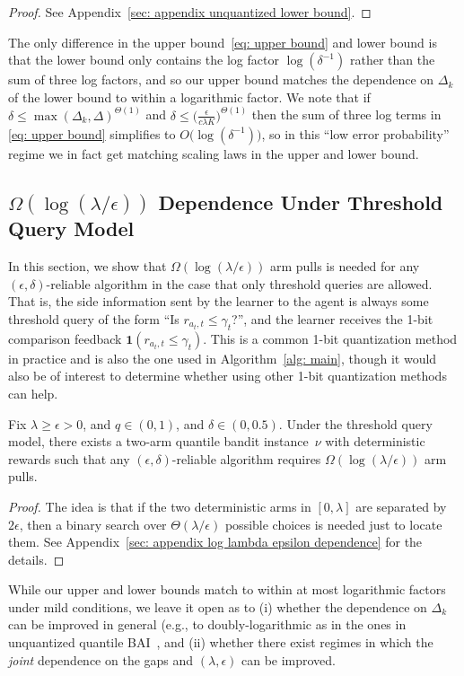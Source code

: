 \begin{proof}
    See Appendix~\ref{sec: appendix unquantized lower bound}.
\end{proof}

The only difference in the upper bound~\eqref{eq: upper bound} and lower bound is that the lower bound only contains the log factor $\log(\delta^{-1})$ rather than the sum of three log factors, and so our upper bound matches the dependence on $\Delta_k$ of the lower bound to within a logarithmic factor.  We note that if $\delta \le \max(\Delta_k,\Delta)^{\Theta(1)}$ and $\delta \le \big( \frac{\epsilon}{c\lambda K} \big)^{\Theta(1)}$ then the sum of three log terms in \eqref{eq: upper bound} simplifies to $O\big( \log(\delta^{-1}) \big)$, so in this ``low error probability'' regime we in fact get matching scaling laws in the upper and lower bound.  


\subsection{$\Omega(\log(\lambda/\epsilon))$ Dependence Under Threshold Query Model}
\label{sec: log lambda epsilon dependence}
In this section, we show that $\Omega(\log(\lambda/\epsilon))$ arm pulls is needed for any $(\epsilon, \delta)$-reliable algorithm in the case that only threshold queries are allowed.
That is, the side information sent by the learner to the agent is always some threshold query of the form ``Is $r_{a_t, t} \le \gamma_t$?'', and the learner receives the 1-bit comparison feedback $\mathbf{1}(r_{a_t, t} \le \gamma_t)$.
This is a common 1-bit quantization method in practice and is also the one used in Algorithm~\ref{alg: main}, though it would also be of interest to determine whether using other 1-bit quantization methods can help.


\begin{theorem}
\label{thm: log lambda/epsilon dependence}
Fix $\lambda \ge \epsilon > 0$, and $q \in (0, 1)$, and $\delta \in (0, 0.5)$.
Under the threshold query model, there exists a two-arm quantile bandit instance~$\nu$ with deterministic rewards such that any $(\epsilon, \delta)$-reliable algorithm requires $\Omega(\log(\lambda/ \epsilon))$ arm pulls.
\end{theorem}

\begin{proof}
    The idea is that if the two deterministic arms in $[0,\lambda]$ are separated by $2\epsilon$, then a binary search over $\Theta(\lambda/\epsilon)$ possible choices is needed just to locate them.  See Appendix~\ref{sec: appendix log lambda epsilon dependence} for the details.
\end{proof}

 While our upper and lower bounds match to within at most logarithmic factors under mild conditions, we leave it open as to 
(i)  whether the dependence on $\Delta_k$ can be improved in general (e.g., to doubly-logarithmic as in the ones in unquantized quantile BAI~\cite{nikolakakis2021quantile, howard2022sequential}, and (ii) whether there exist regimes in which the \emph{joint} dependence on the gaps and $(\lambda,\epsilon)$ can be improved.

